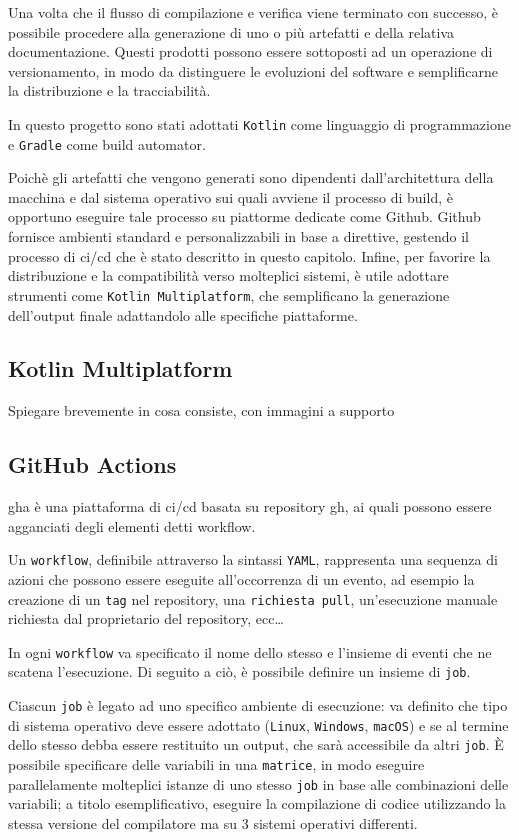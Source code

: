 \documentclass[12pt,a4paper,openright,twoside]{book}
\begin{document}
Una volta che il flusso di compilazione e verifica viene terminato con successo,
è possibile procedere alla generazione di uno o più artefatti e della relativa documentazione.
Questi prodotti possono essere sottoposti ad un operazione di versionamento,
in modo da distinguere le evoluzioni del software e semplificarne la distribuzione
e la tracciabilità.

In questo progetto sono stati adottati \texttt{Kotlin} come linguaggio di programmazione
e \texttt{Gradle} come build automator.

Poichè gli artefatti che vengono generati sono dipendenti dall'architettura della macchina
e dal sistema operativo sui quali avviene il processo di build, è opportuno eseguire tale processo
su piattorme dedicate come Github.
Github fornisce ambienti standard e personalizzabili
in base a direttive, gestendo il processo di \ac{ci}/\ac{cd} che è stato descritto in questo capitolo. 
Infine, per favorire la distribuzione e la compatibilità verso molteplici sistemi,
è utile adottare strumenti come \texttt{Kotlin Multiplatform},
che semplificano la generazione dell'output finale adattandolo alle specifiche piattaforme. 


\subsection{Kotlin Multiplatform}
Spiegare brevemente in cosa consiste, con immagini a supporto

\subsection{GitHub Actions}
 \ac{gha} è una piattaforma di \ac{ci}/\ac{cd} basata su repository \ac{gh},
 ai quali possono essere agganciati degli elementi detti workflow.

 Un \texttt{workflow}, definibile attraverso la sintassi \texttt{YAML}, rappresenta una sequenza di azioni che possono essere eseguite
 all'occorrenza di un evento, ad esempio la creazione di un \texttt{tag} nel repository,
 una \texttt{richiesta pull}, un'esecuzione manuale richiesta dal proprietario del repository, ecc\dots

In ogni \texttt{workflow} va specificato il nome dello stesso e l'insieme di eventi che ne scatena 
l'esecuzione. 
Di seguito a ciò, è possibile definire un insieme di \texttt{job}.

Ciascun \texttt{job} è legato ad uno specifico ambiente di esecuzione: va definito che tipo di
sistema operativo deve essere adottato (\texttt{Linux}, \texttt{Windows}, \texttt{macOS})
e se al termine dello stesso debba essere restituito un output, che sarà accessibile da altri \texttt{job}.
È possibile specificare delle variabili in una \texttt{matrice}, in modo eseguire parallelamente molteplici istanze di uno stesso \texttt{job} 
in base alle combinazioni delle variabili; a titolo esemplificativo, eseguire la compilazione di codice utilizzando
la stessa versione del compilatore ma su 3 sistemi operativi differenti.  
\end{document}
